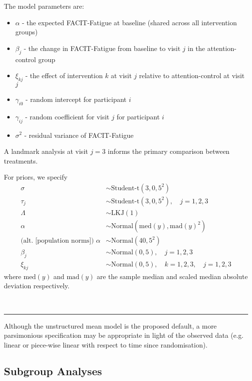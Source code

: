 \documentclass[
]{article}
\providecommand{\tightlist}{%
  \setlength{\itemsep}{0pt}\setlength{\parskip}{0pt}}
\begin{document}
The model parameters are:

\begin{itemize}
  \tightlist
  \item $\alpha$ - the expected FACIT-Fatigue at baseline (shared across all intervention groups)
  \item $\beta_j$ - the change in FACIT-Fatigue from baseline to visit $j$ in the attention-control group
  \item $\xi_{kj}$ - the effect of intervention $k$ at visit $j$ relative to attention-control at visit $j$
  \item $\gamma_{i0}$ - random intercept for participant $i$
  \item $\gamma_{ij}$ - random coefficient for visit $j$ for participant $i$
  \item $\sigma^2$ - residual variance of FACIT-Fatigue
\end{itemize}
A landmark analysis at visit $j=3$ informs the primary comparison between treatments.

For priors, we specify
$$
  \begin{aligned}
  \sigma &\sim \text{Student-t}(3, 0, 5^2) \\
  \tau_j &\sim \text{Student-t}(3, 0, 5^2),\quad j=1,2,3 \\
  \Lambda &\sim \text{LKJ}(1) \\
  \alpha &\sim \text{Normal}\left(\text{med}(y), \text{mad}(y)^2\right) \\
  \text{(alt. [population norms]) } \alpha &\sim \text{Normal}(40, 5^2) \\
  \beta_j &\sim \text{Normal}\left(0, 5\right),\quad j=1,2,3 \\
  \xi_{kj} &\sim \text{Normal}(0, 5),\quad k=1,2,3,\quad j=1,2,3
\end{aligned}
$$
where $\text{med}(y)$ and $\text{mad}(y)$ are the sample median and scaled median absolute deviation respectively.

\
\hrule

Although the unstructured mean model is the proposed default, a more parsimonious specification may be appropriate in light of the observed data (e.g. linear or piece-wise linear with respect to time since randomisation).

\hypertarget{subgroup-analyses}{%
  \subsection{Subgroup Analyses}\label{subgroup-analyses}}
\end{document}
